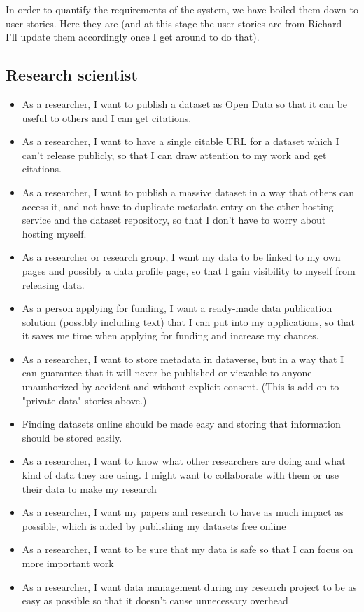 In order to quantify the requirements of the system, we have boiled them down
to user stories. Here they are (and at this stage the user stories are from
Richard - I'll update them accordingly once I get around to do that).

\subsection{Research scientist}

\begin{itemize}
    \item As a researcher, I want to publish a dataset as Open Data so that it
          can be useful to others and I can get citations.
    \item As a researcher, I want to have a single citable URL for a dataset
          which I can't release publicly, so that I can draw attention to my
          work and get citations. 
    \item As a researcher, I want to publish a massive dataset in a way that
          others can access it, and not have to duplicate metadata entry on the
          other hosting service and the dataset repository, so that I don't have
          to worry about hosting myself. 
    \item As a researcher or research group, I want my data to be linked to my
          own pages and possibly a data profile page, so that I gain visibility
          to myself from releasing data. 
    \item As a person applying for funding, I want a ready-made data publication
          solution (possibly including text) that I can put into my
          applications, so that it saves me time when applying for funding and
          increase my chances. 
    \item As a researcher, I want to store metadata in dataverse, but in a way
          that I can guarantee that it will never be published or viewable to
          anyone unauthorized by accident and without explicit consent.  (This
          is add-on to "private data" stories above.)
    \item Finding datasets online should be made easy and storing that information
          should be stored easily.
    \item As a researcher, I want to know what other researchers are doing and
          what kind of data they are using. I might want to collaborate with
          them or use their data to make my research
    \item As a researcher, I want my papers and research to have as much impact
          as possible, which is aided by publishing my datasets free online
    \item As a researcher, I want to be sure that my data is safe so that I can
          focus on more important work
    \item As a researcher, I want data management during my research project to
          be as easy as possible so that it doesn't cause unnecessary overhead
\end{itemize}

